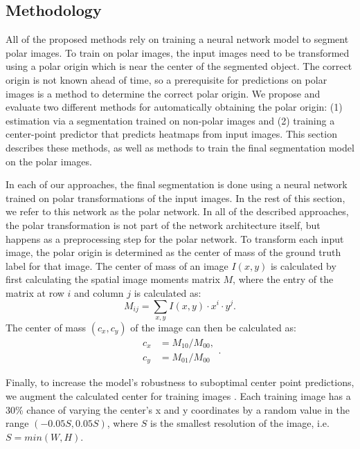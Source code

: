   \subsection{Methodology}
  
All of the proposed methods rely on training a neural network model to segment polar images. To train on 
polar images, the input images need to be transformed using a polar origin which is near the center of 
the 
segmented object. The correct origin is not known ahead of time, so a prerequisite for predictions on polar
images is a method to determine the correct polar origin. We propose and 
evaluate two different methods for automatically obtaining the polar origin: (1)
estimation via a segmentation trained on non-polar images and (2) training a center-point predictor that predicts heatmaps from input images. 
This section describes these methods, as well as methods to train the 
final segmentation model on the polar images.
      
In each of our approaches, the final segmentation is done using a neural network trained on polar 
transformations of the input images. In the rest of this section, we refer to this network as the polar 
network. In all of the described approaches, the polar transformation is not part of the network architecture itself, but happens as a preprocessing step for the polar network.
To transform each input image, the polar origin is determined as the center of mass of the 
ground truth label for that image. The center of mass of an image $I(x, y)$ is calculated by first 
calculating the spatial image moments matrix $M$, where the entry of the matrix at row $i$ and column $j$ is calculated as:
  \begin{equation}
    M_{ij}= \sum _{x,y} I(x,y) \cdot x^i \cdot y^j.
    \label{eq:moments}
  \end{equation}
The center of mass $(c_x, c_y)$ of the image can then be calculated as:
  \begin{equation}
    \begin{aligned}
      c_x &= M_{10} / M_{00}, \\
      c_y &= M_{01} / M_{00}
    \end{aligned}.
    \label{eq:center-mass}
  \end{equation}

Finally, to increase the model's robustness to suboptimal center point predictions, we augment the 
calculated center for training images \cite{estevesPolarTransformerNetworks2018a}. Each training image has 
a 30\% chance of varying the center's x and y coordinates by a random value in the range $(-0.05S, 
0.05S)$, where $S$ is the smallest resolution of the image, i.e. $S = min(W, H)$.
 

